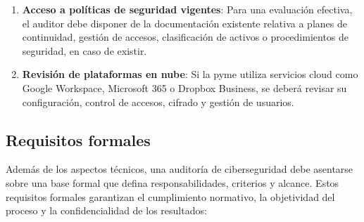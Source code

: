 \documentclass[a4paper, 10pt]{article}
\begin{document}
\begin{enumerate}
    \item \textbf{Acceso a políticas de seguridad vigentes}: Para una evaluación efectiva, el auditor debe disponer de la documentación existente relativa a planes de continuidad, gestión de accesos, clasificación de activos o procedimientos de seguridad, en caso de existir.

    \item \textbf{Revisión de plataformas en nube}: Si la pyme utiliza servicios cloud como Google Workspace, Microsoft 365 o Dropbox Business, se deberá revisar su configuración, control de accesos, cifrado y gestión de usuarios.

\end{enumerate}

\subsection{Requisitos formales}

Además de los aspectos técnicos, una auditoría de ciberseguridad debe asentarse sobre una base formal que defina responsabilidades, criterios y alcance. Estos requisitos formales garantizan el cumplimiento normativo, la objetividad del proceso y la confidencialidad de los resultados:
\end{document}
